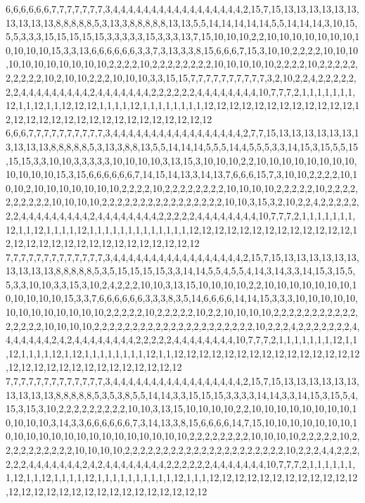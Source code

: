 6,6,6,6,6,6,7,7,7,7,7,7,7,3,4,4,4,4,4,4,4,4,4,4,4,4,4,4,4,4,4,2,15,7,15,13,13,13,13,13,13,13,13,13,13,8,8,8,8,8,5,3,13,3,8,8,8,8,8,13,13,5,5,14,14,14,14,14,5,5,14,14,14,3,10,15,5,5,3,3,3,15,15,15,15,15,3,3,3,3,3,15,3,3,3,13,7,15,10,10,10,2,2,10,10,10,10,10,10,10,10,10,10,10,15,3,3,13,6,6,6,6,6,6,3,3,7,3,13,3,3,8,15,6,6,6,7,15,3,10,10,2,2,2,2,10,10,10,10,10,10,10,10,10,10,10,2,2,2,2,10,2,2,2,2,2,2,2,2,10,10,10,10,10,2,2,2,2,10,2,2,2,2,2,2,2,2,2,2,10,2,10,10,2,2,2,10,10,10,3,3,15,15,7,7,7,7,7,7,7,7,7,7,3,2,10,2,2,4,2,2,2,2,2,2,2,4,4,4,4,4,4,4,4,4,2,4,4,4,4,4,4,4,2,2,2,2,2,2,4,4,4,4,4,4,4,4,10,7,7,7,2,1,1,1,1,1,1,1,12,1,1,12,1,1,12,12,12,1,1,1,1,12,1,1,1,1,1,1,1,1,12,12,12,12,12,12,12,12,12,12,12,12,12,12,12,12,12,12,12,12,12,12,12,12,12,12,12,12,12
6,6,6,7,7,7,7,7,7,7,7,7,7,3,4,4,4,4,4,4,4,4,4,4,4,4,4,4,4,4,4,2,7,7,15,13,13,13,13,13,13,13,13,13,13,8,8,8,8,8,5,3,13,3,8,8,13,5,5,14,14,14,5,5,5,14,4,5,5,5,3,3,14,15,3,15,5,5,15,15,15,3,3,10,10,3,3,3,3,3,10,10,10,10,3,13,15,3,10,10,10,2,2,10,10,10,10,10,10,10,10,10,10,10,10,15,3,15,6,6,6,6,6,6,7,14,15,14,13,3,14,13,7,6,6,6,15,7,3,10,10,2,2,2,2,10,10,10,2,10,10,10,10,10,10,10,2,2,2,2,10,2,2,2,2,2,2,2,2,10,10,10,10,2,2,2,2,2,10,2,2,2,2,2,2,2,2,2,2,10,10,10,10,2,2,2,2,2,2,2,2,2,2,2,2,2,2,2,2,10,10,3,15,3,2,10,2,2,4,2,2,2,2,2,2,2,4,4,4,4,4,4,4,4,4,2,4,4,4,4,4,4,4,4,2,2,2,2,2,4,4,4,4,4,4,4,4,10,7,7,7,2,1,1,1,1,1,1,1,12,1,1,12,1,1,1,1,12,1,1,1,1,1,1,1,1,1,1,1,1,1,12,12,12,12,12,12,12,12,12,12,12,12,12,12,12,12,12,12,12,12,12,12,12,12,12,12,12,12,12
7,7,7,7,7,7,7,7,7,7,7,7,7,3,4,4,4,4,4,4,4,4,4,4,4,4,4,4,4,4,4,2,15,7,15,13,13,13,13,13,13,13,13,13,13,8,8,8,8,8,5,3,5,15,15,15,15,3,3,14,14,5,5,4,5,5,4,14,3,14,3,3,14,15,3,15,5,5,3,3,10,10,3,3,15,3,10,2,4,2,2,2,10,10,3,13,15,10,10,10,10,2,2,10,10,10,10,10,10,10,10,10,10,10,10,15,3,3,7,6,6,6,6,6,6,3,3,3,8,3,5,14,6,6,6,6,14,14,15,3,3,3,10,10,10,10,10,10,10,10,10,10,10,10,10,2,2,2,2,2,10,2,2,2,2,2,10,2,2,10,10,10,10,2,2,2,2,2,2,2,2,2,2,2,2,2,2,2,2,10,10,10,10,2,2,2,2,2,2,2,2,2,2,2,2,2,2,2,2,2,2,2,2,2,10,2,2,2,4,2,2,2,2,2,2,2,4,4,4,4,4,4,4,2,4,2,4,4,4,4,4,4,4,4,2,2,2,2,2,4,4,4,4,4,4,4,4,10,7,7,7,2,1,1,1,1,1,1,1,12,1,1,12,1,1,1,1,12,1,12,1,1,1,1,1,1,1,1,12,1,1,12,12,12,12,12,12,12,12,12,12,12,12,12,12,12,12,12,12,12,12,12,12,12,12,12,12,12,12,12
7,7,7,7,7,7,7,7,7,7,7,7,7,3,4,4,4,4,4,4,4,4,4,4,4,4,4,4,4,4,4,2,15,7,15,13,13,13,13,13,13,13,13,13,13,8,8,8,8,8,5,3,5,3,8,5,5,14,14,3,3,15,15,15,3,3,3,3,14,14,3,3,14,15,3,15,5,4,15,3,15,3,10,2,2,2,2,2,2,2,2,2,10,10,3,13,15,10,10,10,10,2,2,10,10,10,10,10,10,10,10,10,10,10,10,3,14,3,3,6,6,6,6,6,6,7,3,14,13,3,8,15,6,6,6,6,14,7,15,10,10,10,10,10,10,10,10,10,10,10,10,10,10,10,10,10,10,10,10,10,10,2,2,2,2,2,2,2,2,10,10,10,10,2,2,2,2,2,10,2,2,2,2,2,2,2,2,2,2,10,10,10,10,2,2,2,2,2,2,2,2,2,2,2,2,2,2,2,2,2,2,2,2,2,10,2,2,2,4,4,2,2,2,2,2,2,4,4,4,4,4,4,4,2,4,2,4,4,4,4,4,4,4,4,2,2,2,2,2,2,4,4,4,4,4,4,4,10,7,7,7,2,1,1,1,1,1,1,1,12,1,1,12,1,1,1,1,12,1,1,1,1,1,1,1,1,1,1,12,1,1,1,12,12,12,12,12,12,12,12,12,12,12,12,12,12,12,12,12,12,12,12,12,12,12,12,12,12,12,12
